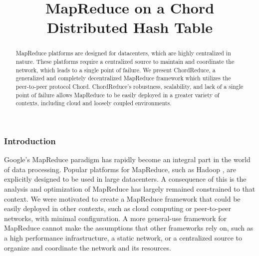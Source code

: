 \documentclass{article}
\title{MapReduce on a Chord Distributed Hash Table}
\date{} %
\begin{document}
\maketitle

\begin{abstract}

MapReduce platforms are designed for datacenters, which are highly centralized in nature.  These platforms require a centralized source to maintain and coordinate the network, which leads to a single point of failure.  We present ChordReduce, a generalized and completely decentralized MapReduce framework which utilizes the peer-to-peer protocol Chord.  ChordReduce's robustness, scalability, and lack of a single point of failure allows MapReduce to be easily deployed in a greater variety of contexts, including  cloud and loosely coupled environments.


\end{abstract}




\subsubsection*{Introduction}

Google's MapReduce \cite{mapreduce} paradigm has rapidly become an integral part in the world of data processing.
Popular platforms for MapReduce, such as Hadoop \cite{Hadoop}, are explicitly designed to be used in large datacenters.  
A consequence of this is the analysis and optimization of MapReduce has largely remained constrained to that context.  
We were motivated to create a MapReduce framework that could be easily deployed in other contexts, such as cloud computing or peer-to-peer networks, with minimal configuration.
A more general-use framework for MapReduce cannot make the assumptions that other frameworks rely on, such as a high performance infrastructure, a static network, or a centralized source to organize and coordinate the network and its resources.  
\end{document}
